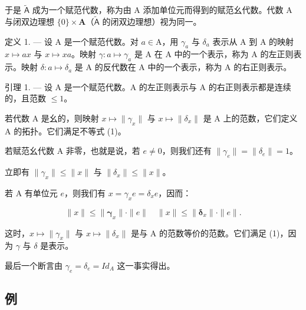 于是 \(\widetilde{\mathsf{A}}\) 成为一个赋范代数，称为由 A 添加单位元而得到的赋范幺代数。代数 A 与闭双边理想 \(\{0\} \times \mathbf{A}\)（\(\widetilde{\mathsf{A}}\) 的闭双边理想）视为同一。

定义 1. --- 设 A 是一个赋范代数。对 \(a \in \mathrm{A}\)，用 \(\gamma_{a}\) 与 \(\delta_{a}\) 表示从 A 到 A 的映射 \(x \mapsto ax\) 与 \(x \mapsto xa\)。映射 \(\gamma: a \mapsto \gamma_{a}\) 是 A 在 A 中的一个表示，称为 A 的左正则表示。映射 \(\delta: a \mapsto \delta_{a}\) 是 A 的反代数在 A 中的一个表示，称为 A 的右正则表示。

引理 1. --- 设 A 是一个赋范代数。A 的左正则表示与 A 的右正则表示都是连续的，且范数 \(\leqslant 1\)。

若代数 A 是幺的，则映射 \(x \mapsto \|\gamma_{x}\|\) 与 \(x \mapsto \|\delta_{x}\|\) 是 A 上的范数，它们定义 A 的拓扑。它们满足不等式 (1)。

若赋范幺代数 A 非零，也就是说，若 \(e \neq 0\)，则我们还有 \(\|\gamma_{e}\| = \|\delta_{e}\| = 1\)。

立即有 \(\|\gamma_{x}\|\leqslant\|x\|\) 与 \(\|\delta_{x}\|\leqslant\|x\|\)。

若 A 有单位元 \(e\)，则我们有 \(x = \gamma_x e = \delta_x e\)，因而：

\[
\| x \| \leqslant \| \boldsymbol {\gamma} _ {x} \| \cdot \| e \| \quad \| x \| \leqslant \| \boldsymbol {\delta} _ {x} \| \cdot \| e \|.\tag{2}
\]

这时，\(x \mapsto \|\gamma_{x}\|\) 与 \(x \mapsto \|\delta_{x}\|\) 是与 A 的范数等价的范数。它们满足 (1)，因为 \(\gamma\) 与 \(\delta\) 是表示。

最后一个断言由 \(\gamma_{e} = \delta_{e} = Id_{A}\) 这一事实得出。

\subsection{例}


